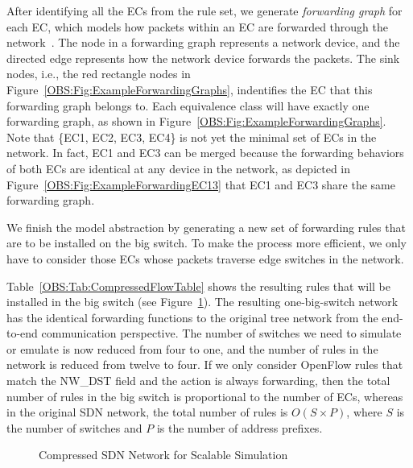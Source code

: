 After identifying all the ECs from the rule set, we generate \textit{forwarding graph} for each EC, which models how packets within an EC are forwarded through the network~\cite{Veriflow}.
The node in a forwarding graph represents a network device, and the directed edge represents how the network device forwards the packets.
The sink nodes, i.e., the red rectangle nodes in Figure~\ref{OBS:Fig:ExampleForwardingGraphs}, indentifies the EC that this forwarding graph belongs to.
Each equivalence class will have exactly one forwarding graph, as shown in Figure~\ref{OBS:Fig:ExampleForwardingGraphs}.
Note that \{EC1, EC2, EC3, EC4\} is not yet the minimal set of ECs in the network.
In fact, EC1 and EC3 can be merged because the forwarding behaviors of both ECs are identical at any device in the network,
as depicted in Figure~\ref{OBS:Fig:ExampleForwardingEC13} that EC1 and EC3 share the same forwarding graph.

We finish the model abstraction by generating a new set of forwarding rules that are to be installed on the big switch.
To make the process more efficient, we only have to consider those ECs whose packets traverse edge switches in the network.

Table~\ref{OBS:Tab:CompressedFlowTable} shows the resulting rules that will be installed in the big switch (see Figure~\ref{OBS:Fig:ExampleBigSwitch}).
The resulting one-big-switch network has the identical forwarding functions to the original tree network from the end-to-end communication perspective.
The number of switches we need to simulate or emulate is now reduced from four to one, and the number of rules in the network is reduced from twelve to four.
If we only consider OpenFlow rules that match the NW\_DST field and the action is always forwarding,
then the total number of rules in the big switch is proportional to the number of ECs,
whereas in the original SDN network, the total number of rules is $O(S\times P)$,
where $S$ is the number of switches and $P$ is the number of address prefixes.

\begin{figure}[t]
    \centering
    \caption{Compressed SDN Network for Scalable Simulation}
    \label{OBS:Fig:ExampleBigSwitch}
\end{figure}
